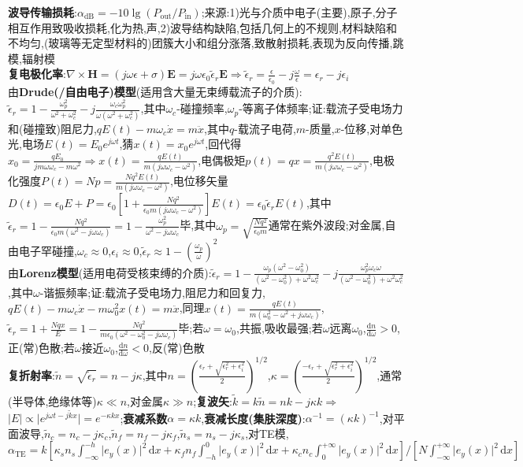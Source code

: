 \documentclass[a4paper,10pt]{article}
\providecommand{\abs}[1]{\lvert#1\rvert}
\begin{document}
\begin{multicols*}{2}
\textbf{波导传输损耗}:$\alpha_{\text{dB}}=-10\lg(P_{\text{out}}/P_{\text{in}})$;来源:1)光与介质中电子(主要),原子,分子相互作用致吸收损耗,化为热,声,2)波导结构缺陷,包括几何上的不规则,材料缺陷和不均匀,(玻璃等无定型材料的)团簇大小和组分涨落,致散射损耗,表现为反向传播,跳模,辐射模\\
\textbf{复电极化率}:$\nabla\times\bm{H}=(j\omega\epsilon+\sigma)\bm{E}=j\omega\epsilon_0\tilde{\epsilon}_r\bm{E}\Rightarrow\tilde{\epsilon}_{r}=\frac{\epsilon}{\epsilon_0}-j\frac{\omega}{\epsilon}=\epsilon_r-j\epsilon_i$\\
由\textbf{Drude(/自由电子)模型}(适用含大量无束缚载流子的介质):$\tilde{\epsilon}_r=1-\frac{\omega_p^2}{\omega^2+\omega_c^2}-j\frac{\omega_c\omega_p^2}{\omega(\omega^2+\omega_c^2)}$,其中$\omega_c$-碰撞频率,$\omega_p$-等离子体频率;证:载流子受电场力和(碰撞致)阻尼力,$qE(t)-m\omega_c\dot{x}=m\ddot{x}$,其中$q$-载流子电荷,$m$-质量,$x$-位移,对单色光,电场$E(t)=E_0e^{j\omega t}$,猜$x(t)=x_0e^{j\omega t}$,回代得$x_0=\frac{qE_0}{jm\omega\omega_c-m\omega^2}\Rightarrow x(t)=\frac{qE(t)}{m(j\omega\omega_c-\omega^2)}$,电偶极矩$p(t)=qx=\frac{q^2E(t)}{m(j\omega\omega_c-\omega^2)}$,电极化强度$P(t)=Np=\frac{Nq^2E(t)}{m(j\omega\omega_c-\omega^2)}$,电位移矢量$D(t)=\epsilon_0E+P=\epsilon_0[1+\frac{Nq^2}{\epsilon_0m(j\omega\omega_c-\omega^2)}]E(t)=\epsilon_0\tilde{\epsilon}_rE(t)$,其中$\tilde{\epsilon}_r=1-\frac{Nq^2}{\epsilon_0m(\omega^2-j\omega\omega_c)}=1-\frac{\omega_p^2}{\omega^2-j\omega\omega_c}$毕,其中$\omega_p=\sqrt{\frac{Nq^2}{\epsilon_0m}}$通常在紫外波段;对金属,自由电子罕碰撞,$\omega_c\approx 0$,$\epsilon_i\approx 0$,$\tilde{\epsilon}_r\approx 1-(\frac{\omega_p}{\omega})^2$\\
由\textbf{Lorenz模型}(适用电荷受核束缚的介质):$\tilde{\epsilon}_r=1-\frac{\omega_p(\omega^2-\omega_0^2)}{(\omega^2-\omega_0^2)+\omega^2\omega_c^2}-j\frac{\omega_p^2\omega_c\omega}{(\omega^2-\omega_0^2)+\omega^2\omega_c^2}$,其中$\omega$-谐振频率;证:载流子受电场力,阻尼力和回复力,$qE(t)-m\omega_c\dot{x}-m\omega_0^2x(t)=m\ddot{x}$,同理$x(t)=\frac{qE(t)}{m(\omega_0^2-\omega^2+j\omega\omega_c)}$,$\tilde{\epsilon}_r=1+\frac{Nqx}{E}=1-\frac{Nq^2}{m\epsilon_0(\omega^2-\omega_0^2-j\omega\omega_c)}$毕;若$\omega=\omega_0$,共振,吸收最强;若$\omega$远离$\omega_0$,$\frac{\mathrm{d}n}{\mathrm{d}\omega}>0$,正(常)色散;若$\omega$接近$\omega_0$,$\frac{\mathrm{d}n}{\mathrm{d}\omega}<0$,反(常)色散\\ %
\textbf{复折射率}:$\tilde{n}=\sqrt{\tilde{\epsilon}_r}=n-j\kappa$,其中$n=(\frac{\epsilon_r+\sqrt{\epsilon_r^2+\epsilon_i^2}}{2})^{1/2}$,$\kappa=(\frac{-\epsilon_r+\sqrt{\epsilon_r^2+\epsilon_i^2}}{2})^{1/2}$,通常(半导体,绝缘体等)$\kappa\ll n$,对金属$\kappa\gg n$;\textbf{复波矢}:$\tilde{k}=k\tilde{n}=nk-j\kappa k\Rightarrow$$\abs{E}\propto\abs{e^{j\omega t-j\tilde{k}x}}=e^{-\kappa kx}$;\textbf{衰减系数}$\alpha=\kappa k$,\textbf{衰减长度(集肤深度)}:$\alpha^{-1}=(\kappa k)^{-1}$,对平面波导,$\tilde{n}_c=n_c-j\kappa_c$,$\tilde{n}_f=n_f-j\kappa_f$,$\tilde{n}_s=n_s-j\kappa_s$,对TE模,$\alpha_{\text{TE}}=k[\kappa_sn_s\int_{-\infty}^{-h}\abs{e_y(x)}^2\,\mathrm{d}x+\kappa_fn_f\int_{-h}^0\abs{e_y(x)}^2\,\mathrm{d}x+\kappa_cn_c\int_0^{+\infty}\abs{e_y(x)}^2\,\mathrm{d}x]/[N\int_{-\infty}^{+\infty}\abs{e_y(x)}^2\,\mathrm{d}x]$\\
$$
\end{multicols*}
\end{document}
